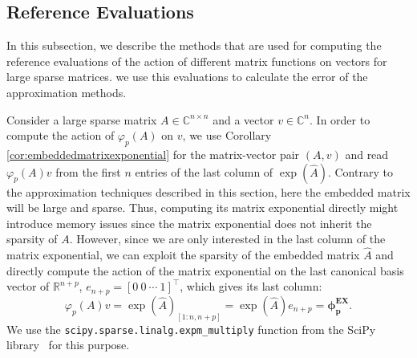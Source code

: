 \subsection{Reference Evaluations}
\label{sec:exactevaluation}

In this subsection, we describe the methods that are used for computing the reference
evaluations of the action of different matrix functions on vectors for large sparse matrices.
we use this evaluations to calculate the error of the approximation methods.

Consider a large sparse matrix $A \in \mathbb{C}^{n \times n}$ and a vector $v \in \mathbb{C}^n$.
In order to compute the action of $\varphi_p(A)$ on $v$, we use Corollary
\ref{cor:embeddedmatrixexponential} for the matrix-vector pair $(A, v)$ and
read $\varphi_p(A) v$ from the first $n$ entries of the last column of $\exp(\hat{A})$.
Contrary to the approximation techniques described in this section, here the embedded
matrix will be large and sparse.
Thus, computing its matrix exponential directly might introduce memory issues
since the matrix exponential does not inherit the sparsity of $A$.
However, since we are only interested in the last column of the matrix exponential,
we can exploit the sparsity of the embedded matrix $\hat{A}$ and directly compute
the action of the matrix exponential on the last canonical basis vector of $\mathbb{R}^{n+p}$,
$e_{n+p} = [0\:0\:\cdots\:1]^\top$, which gives its last column:
\begin{equation*}
    \varphi_p(A) v = \exp(\hat{A})_{[1 : n, n+p]} = \exp(\hat{A}) e_{n+p} = \mathbf{\phi_{p}^{EX}}.
\end{equation*}
We use the \texttt{scipy.sparse.linalg.expm\_multiply} function from
the SciPy library~\cite{SciPy2020} for this purpose.

